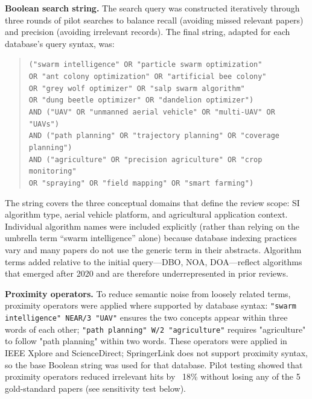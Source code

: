 \documentclass[review,3p,times]{elsarticle}
\begin{document}
\textbf{Boolean search string.} The search query was constructed iteratively through three rounds of pilot searches to balance recall (avoiding missed relevant papers) and precision (avoiding irrelevant records). The final string, adapted for each database's query syntax, was:

\begin{quote}
\small
\texttt{("swarm intelligence" OR "particle swarm optimization"} \\
\texttt{OR "ant colony optimization" OR "artificial bee colony"} \\
\texttt{OR "grey wolf optimizer" OR "salp swarm algorithm"} \\
\texttt{OR "dung beetle optimizer" OR "dandelion optimizer")} \\
\texttt{AND ("UAV" OR "unmanned aerial vehicle" OR "multi-UAV" OR "UAVs")} \\
\texttt{AND ("path planning" OR "trajectory planning" OR "coverage planning")} \\
\texttt{AND ("agriculture" OR "precision agriculture" OR "crop monitoring"} \\
\texttt{OR "spraying" OR "field mapping" OR "smart farming")}
\end{quote}

The string covers the three conceptual domains that define the review scope: SI algorithm type, aerial vehicle platform, and agricultural application context. Individual algorithm names were included explicitly (rather than relying on the umbrella term ``swarm intelligence'' alone) because database indexing practices vary and many papers do not use the generic term in their abstracts. Algorithm terms added relative to the initial query---DBO, NOA, DOA---reflect algorithms that emerged after 2020 and are therefore underrepresented in prior reviews.

\textbf{Proximity operators.} To reduce semantic noise from loosely related terms, proximity operators were applied where supported by database syntax: \texttt{"swarm intelligence" NEAR/3 "UAV"} ensures the two concepts appear within three words of each other; \texttt{"path planning" W/2 "agriculture"} requires "agriculture" to follow "path planning" within two words. These operators were applied in IEEE Xplore and ScienceDirect; SpringerLink does not support proximity syntax, so the base Boolean string was used for that database. Pilot testing showed that proximity operators reduced irrelevant hits by ~18\% without losing any of the 5 gold-standard papers (see sensitivity test below).
\end{document}
